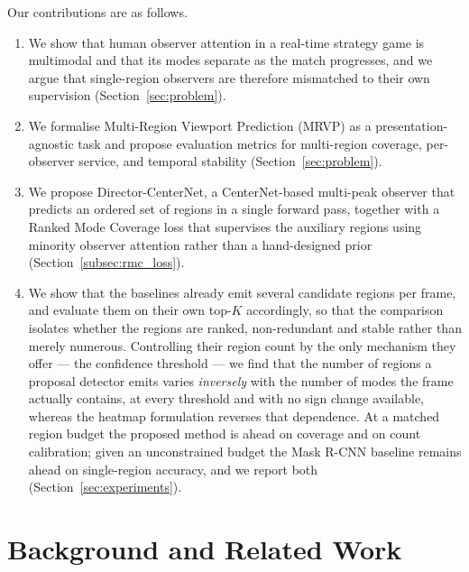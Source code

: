 \documentclass[preprint,12pt]{elsarticle}
\begin{document}
Our contributions are as follows.

\begin{enumerate}
  \item We show that human observer attention in a real-time strategy game is
        multimodal and that its modes separate as the match progresses, and we
        argue that single-region observers are therefore mismatched to their
        own supervision (Section~\ref{sec:problem}).
  \item We formalise Multi-Region Viewport Prediction (MRVP) as a
        presentation-agnostic task and propose evaluation metrics for
        multi-region coverage, per-observer service, and temporal stability
        (Section~\ref{sec:problem}).
  \item We propose Director-CenterNet, a CenterNet-based multi-peak observer
        that predicts an ordered set of regions in a single forward pass,
        together with a Ranked Mode Coverage loss that supervises the auxiliary
        regions using minority observer attention rather than a hand-designed
        prior (Section~\ref{subsec:rmc_loss}).
  \item We show that the baselines already emit several candidate regions per
        frame, and evaluate them on their own top-$K$ accordingly, so that the
        comparison isolates whether the regions are ranked, non-redundant and
        stable rather than merely numerous. Controlling their region count by
        the only mechanism they offer — the confidence threshold — we find that
        the number of regions a proposal detector emits varies
        \emph{inversely} with the number of modes the frame actually contains,
        at every threshold and with no sign change available, whereas the
        heatmap formulation reverses that dependence. At a matched region
        budget the proposed method is ahead on coverage and on count
        calibration; given an unconstrained budget the Mask R-CNN baseline
        remains ahead on single-region accuracy, and we report both
        (Section~\ref{sec:experiments}).
\end{enumerate}

\section{Background and Related Work}
\label{sec:related}
\end{document}

